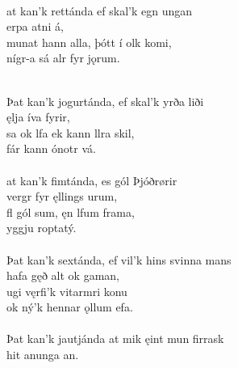  \\

\bva {}at kan'k rettánda \hld ef skal'k egn ungan \\%
\ind {}erpa atni á,\footnotemark[49] \\%
munat hann alla, \hld þótt í olk komi, \\%
\ind {}nígr-a sá alr fyr jǫrum.\\%

 \\

\bva Þat kan'k jogurtánda, \hld ef skal'k yrða liði \\%
\ind {}ęlja íva fyrir, \\%
sa ok lfa \hld ek kann llra skil, \\%
\ind fár kann ónotr vá.\\%

 \\

\bva {}at kan'k fimtánda, \hld es gól {Þ}jóðrørir \\%
\ind {}vergr fyr ęllings urum, \\%
fl gól sum, \hld ęn lfum frama, \\%
\ind {}yggju roptatý.\\%

 \\

\bva Þat kan'k sextánda, \hld ef vil'k hins svinna mans \\%
\ind hafa gęð alt ok gaman, \\%
ugi vęrfi'k \hld {}vitarmri konu \\%
\ind ok ný'k hennar ǫllum efa.\\%

 \\

\bva Þat kan'k jautjánda \hld at mik ęint mun firrask \\%
\ind hit anunga an.\\%

 \\

